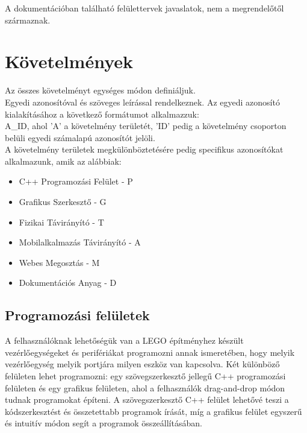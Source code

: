 \documentclass{article}
\begin{document}
A dokumentációban található felülettervek javaslatok, nem a megrendelőtől származnak.\\


\pagebreak
\section{Követelmények}

Az összes követelményt egységes módon definiáljuk. \\
Egyedi azonosítóval és szöveges leírással rendelkeznek. Az egyedi azonosító kialakításához a következő formátumot alkalmazzuk:\\ 
A\_ID, ahol 'A' a követelmény területét, 'ID' pedig a követelmény csoporton belüli egyedi számalapú azonosítót jelöli. \\
A követelmény területek megkülönböztetésére pedig specifikus azonosítókat alkalmazunk, amik az alábbiak:
\\
\begin{itemize}
\setlength\itemsep{-0.8em}
\item C++ Programozási Felület - P \\
\item Grafikus Szerkesztő - G \\
\item Fizikai Távirányító - T \\
\item Mobilalkalmazás Távirányító - A \\
\item Webes Megosztás - M \\
\item Dokumentációs Anyag - D \\
\end{itemize}


\subsection{Programozási felületek}

A felhasználóknak lehetőségük van a LEGO építményhez készült vezérlőegységeket és perifériákat programozni annak ismeretében, hogy melyik vezérlőegység melyik portjára milyen eszköz van kapcsolva. Két különböző felületen lehet programozni: egy szövegszerkesztő jellegű C++ programozási felületen és egy grafikus felületen, ahol a felhasználók drag-and-drop módon tudnak programokat építeni. A szövegszerkesztő C++ felület lehetővé teszi a kódszerkesztést és összetettabb programok írását, míg a grafikus felület egyszerű és intuitív módon segít a programok összeállításában.
\end{document}

